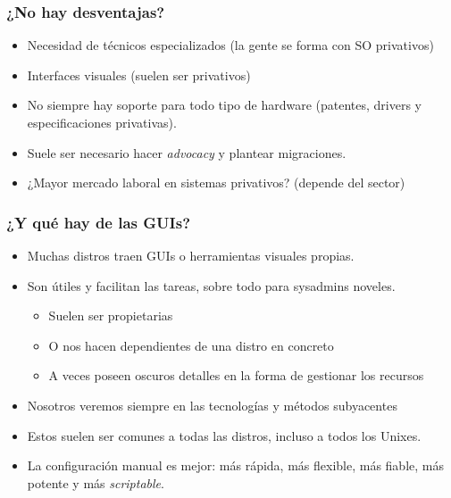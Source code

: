 \documentclass{beamer}
\begin{document}

\begin{frame}
\frametitle{¿No hay desventajas?}

\pause

\begin{itemize}
\item Necesidad de técnicos especializados (la gente se forma con SO privativos)
\item Interfaces visuales (suelen ser privativos)
\item No siempre hay soporte para todo tipo de hardware (patentes, drivers y especificaciones privativas).
\item Suele ser necesario hacer \textit{advocacy} y plantear migraciones.
\item ¿Mayor mercado laboral en sistemas privativos? (depende del sector)
\end{itemize}
\end{frame}


\begin{frame}
\frametitle{¿Y qué hay de las GUIs?}

\pause

\begin{itemize}
\item Muchas distros traen GUIs o herramientas visuales propias. 
\item Son útiles y facilitan las tareas, sobre todo para sysadmins noveles.
	\begin{itemize}
	\item Suelen ser propietarias
	\item O nos hacen dependientes de una distro en concreto
	\item A veces poseen oscuros detalles en la forma de gestionar los recursos
	\end{itemize}
\item Nosotros veremos siempre en las tecnologías y métodos subyacentes
\item Estos suelen ser comunes a todas las distros, incluso a todos los Unixes.
\item La configuración manual es mejor: más rápida, más flexible, más fiable, más potente y más \textit{scriptable}.
\end{itemize}
\end{frame}
\end{document}
